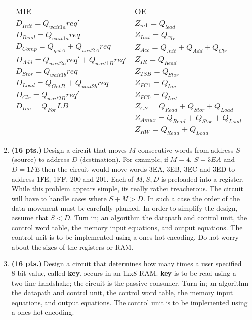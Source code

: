 \begin{enumerate}
\begin{onlysolution}
{\begin{tabular}{ll}
MIE                                     &       OE                      \\
$D_{Init}= Q_{wait1a}req'$            &  $Z_{m1} = Q_{load}$           \\
$D_{Read } = Q_{wait1a}req$             &  $Z_{Init} = Q_{Clr}$           \\
$D_{Comp}= Q_{getA} + Q_{wait2A}req$  &  $Z_{Acc} = Q_{Init} + Q_{Add} + Q_{Clr}$               \\
$D_{Add}= Q_{wait2a}req' + Q_{wait1B}req'$   &  $Z_{IR} = Q_{Read}$     \\
$D_{Stor} = Q_{wait1b}req$             &  $Z_{TSB} = Q_{Stor}$         \\
$D_{Load}= Q_{GetB} + Q_{wait2b}req$  &  $Z_{PC1} = Q_{Inc}$          \\
$D_{Clr  } = Q_{wait2B}req'$            &  $Z_{PC0} = Q_{Init}$          \\
$D_{Inc } = Q_{For}LB$                 &   $Z_{CS} = Q_{Read}+Q_{Stor}+Q_{Load}$     \\
					&   $Z_{Amux} = Q_{Read}+Q_{Stor}+Q_{Load}$   \\
					&   $Z_{RW} = Q_{Read}+Q_{Load}$            \\
\end{tabular}

}\end{onlysolution} 

\item \textbf{ (16 pts.)}
Design a circuit that moves $M$ consecutive words from address $S$ (source) to
address $D$ (destination).  For example, if $M=4$, $S=3EA$ and $D=1FE$ then the 
circuit would move words 3EA, 3EB, 3EC and 3ED to address 1FE, 1FF, 200 and 201.
Each of $M,S,D$ is preloaded into a register.  While this problem appears simple,
its really rather treacherous.  The circuit will have to handle cases where 
$S+M > D$.  In such a case the order of the data movement must be carefully planned.
In order to simplify the design, assume that $S<D$.  
Turn in; an algorithm the datapath and control unit, the control word 
table, the memory input equations, and output equations.  
The control unit is to be implemented using a ones hot encoding.
Do not worry about the sizes of the
registers or RAM.

\item \textbf{ (16 pts.)}
Design a circuit that determines how many times a user
specified 8-bit value, called \textbf{ key}, occurs in an 1kx8 RAM.  
\textbf{ key} is to be read using a two-line handshake; the circuit 
is the passive consumer.
Turn in; an algorithm the datapath and control unit, the control word 
table, the memory input equations, and output equations.  
The control unit is to be implemented using a ones hot encoding.



\end{enumerate}
